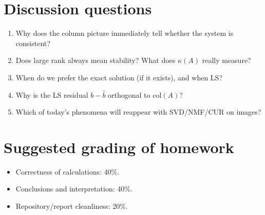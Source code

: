\documentclass[12pt]{article}
\begin{document}
\section*{Discussion questions}
\begin{enumerate}[label=\textbf{D\arabic*}]
\item Why does the column picture immediately tell whether the system is consistent?
\item Does large rank always mean stability? What does $\kappa(A)$ really measure?
\item When do we prefer the exact solution (if it exists), and when LS?
\item Why is the LS residual $b-\hat b$ orthogonal to $\mathrm{col}(A)$?
\item Which of today’s phenomena will reappear with SVD/NMF/CUR on images?
\end{enumerate}

\section*{Suggested grading of homework}
\begin{itemize}
\item Correctness of calculations: 40\%.
\item Conclusions and interpretation: 40\%.
\item Repository/report cleanliness: 20\%.
\end{itemize}
\end{document}
